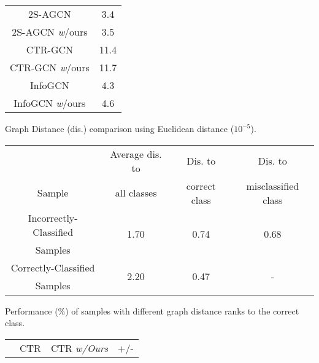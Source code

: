 \documentclass{article} \usepackage{iclr2023_conference,times}
\begin{document}
\begin{minipage}{\textwidth}
\begin{minipage}[t]{0.43\textwidth}
\begin{tabular}{c||c}
       \hline \hline
        2S-AGCN & 3.4 \\
        2S-AGCN \textit{w}/ours & 3.5 \color{red}{$\uparrow$ 2.9\%} \\\hline
        CTR-GCN & 11.4  \\
        CTR-GCN \textit{w}/ours & 11.7 \color{red}{$\uparrow$ 2.6\%} \\\hline
        InfoGCN & 4.3 \\
        InfoGCN \textit{w}/ours & 4.6 \color{red}{$\uparrow$ 7.0\%} \\
        \hline
    \end{tabular}
    \label{table:train comsumption}
\end{minipage}

\begin{minipage}[t]{0.5\textwidth}
\centering
\setlength\tabcolsep{1pt}
\makeatletter{}
\setlength\tabcolsep{2.5pt}
   \scriptsize
   \caption{Graph Distance (dis.) comparison using Euclidean distance ($10^{- 5}$).}
    \begin{tabular}{c||c||c||c}
\cellcolor{gray!30} & \cellcolor{gray!30} Average dis. to & \cellcolor{gray!30} Dis. to & \cellcolor{gray!30} Dis. to \\
        \multirow{-2}{*}{\cellcolor{gray!30} Sample} & \cellcolor{gray!30} all classes & \cellcolor{gray!30} correct class & \cellcolor{gray!30} misclassified class \\
       \hline \hline
        Incorrectly-Classified & \multirow{2}{*}{1.70} & \multirow{2}{*}{0.74} & \multirow{2}{*}{0.68} \\
        Samples & & & \\\hline
Correctly-Classified & \multirow{2}{*}{2.20} & \multirow{2}{*}{0.47} & \multirow{2}{*}{-} \\
Samples & & & \\
        \hline
    \end{tabular}
    \label{table:Graph Distance}
\end{minipage}
\hspace{0.5cm}
\begin{minipage}[t]{0.5\textwidth}
\centering
\setlength\tabcolsep{2pt}
\makeatletter{}
\setlength\tabcolsep{2.5pt}
   \scriptsize
   \caption{Performance (\%) of samples with different graph distance ranks to the correct class.}
    \begin{tabular}{c||c||c||c}
\rowcolor{gray!30} & CTR & CTR \textit{w/Ours} & +/- \\

\end{tabular}
\end{minipage}
\end{minipage}
\end{document}
